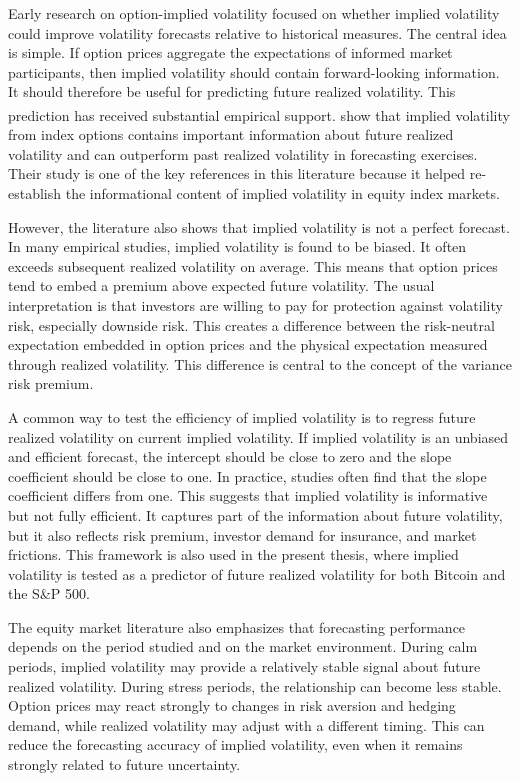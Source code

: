\documentclass[11pt,a4paper,openany]{report}
\newcommand{\fcitet}[1]{%
  \citet{#1}%
  \refstepcounter{footnote}%
  \hyperlink{cite.#1}{\textsuperscript{\thefootnote}}%
  \footnotetext{\bibentry{#1}.}%
}
\begin{document}
Early research on option-implied volatility focused on whether implied
volatility could improve volatility forecasts relative to historical
measures. The central idea is simple. If option prices aggregate the
expectations of informed market participants, then implied volatility
should contain forward-looking information. It should therefore be
useful for predicting future realized volatility. This prediction has
received substantial empirical support. \fcitet{christensen1998} show that implied
volatility from index options contains important information about
future realized volatility and can outperform past realized volatility
in forecasting exercises. Their study is one of the key references in
this literature because it helped re-establish the informational content
of implied volatility in equity index markets.

However, the literature also shows that implied volatility is not a
perfect forecast. In many empirical studies, implied volatility is found
to be biased. It often exceeds subsequent realized volatility on
average. This means that option prices tend to embed a premium above
expected future volatility. The usual interpretation is that investors
are willing to pay for protection against volatility risk, especially
downside risk. This creates a difference between the risk-neutral
expectation embedded in option prices and the physical expectation
measured through realized volatility. This difference is central to the
concept of the variance risk premium.

A common way to test the efficiency of implied volatility is to regress
future realized volatility on current implied volatility. If implied
volatility is an unbiased and efficient forecast, the intercept should
be close to zero and the slope coefficient should be close to one. In
practice, studies often find that the slope coefficient differs from
one. This suggests that implied volatility is informative but not fully
efficient. It captures part of the information about future volatility,
but it also reflects risk premium, investor demand for insurance, and
market frictions. This framework is also used in the present thesis,
where implied volatility is tested as a predictor of future realized
volatility for both Bitcoin and the S\&P 500.

The equity market literature also emphasizes that forecasting
performance depends on the period studied and on the market environment.
During calm periods, implied volatility may provide a relatively stable
signal about future realized volatility. During stress periods, the
relationship can become less stable. Option prices may react strongly to
changes in risk aversion and hedging demand, while realized volatility
may adjust with a different timing. This can reduce the forecasting
accuracy of implied volatility, even when it remains strongly related to
future uncertainty.
\end{document}
